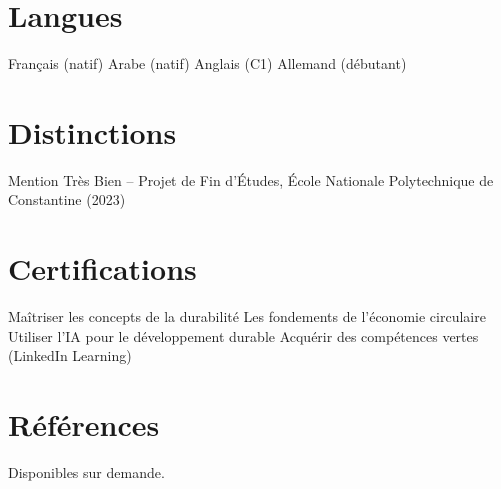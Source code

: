 \documentclass[10pt,a4paper]{article}
\begin{document}
\section*{Langues}
{\small Français (natif) \quad\textbullet\quad Arabe (natif) \quad\textbullet\quad Anglais (C1) \quad\textbullet\quad Allemand (débutant)}

\section*{Distinctions}
{\small Mention Très Bien -- Projet de Fin d'Études, École Nationale Polytechnique de Constantine (2023)}

\section*{Certifications}
{\small Maîtriser les concepts de la durabilité \quad\textbullet\quad Les fondements de l'économie circulaire \quad\textbullet\quad Utiliser l'IA pour le développement durable \quad\textbullet\quad Acquérir des compétences vertes (LinkedIn Learning)}

\section*{Références}
{\small Disponibles sur demande.}
\end{document}
